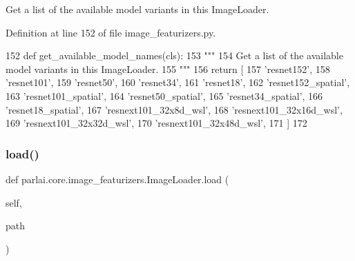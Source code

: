 \begin{DoxyVerb}Get a list of the available model variants in this ImageLoader.
\end{DoxyVerb}
 

Definition at line 152 of file image\+\_\+featurizers.\+py.


\begin{DoxyCode}
152     \textcolor{keyword}{def }get\_available\_model\_names(cls):
153         \textcolor{stringliteral}{"""}
154 \textcolor{stringliteral}{        Get a list of the available model variants in this ImageLoader.}
155 \textcolor{stringliteral}{        """}
156         \textcolor{keywordflow}{return} [
157             \textcolor{stringliteral}{'resnet152'},
158             \textcolor{stringliteral}{'resnet101'},
159             \textcolor{stringliteral}{'resnet50'},
160             \textcolor{stringliteral}{'resnet34'},
161             \textcolor{stringliteral}{'resnet18'},
162             \textcolor{stringliteral}{'resnet152\_spatial'},
163             \textcolor{stringliteral}{'resnet101\_spatial'},
164             \textcolor{stringliteral}{'resnet50\_spatial'},
165             \textcolor{stringliteral}{'resnet34\_spatial'},
166             \textcolor{stringliteral}{'resnet18\_spatial'},
167             \textcolor{stringliteral}{'resnext101\_32x8d\_wsl'},
168             \textcolor{stringliteral}{'resnext101\_32x16d\_wsl'},
169             \textcolor{stringliteral}{'resnext101\_32x32d\_wsl'},
170             \textcolor{stringliteral}{'resnext101\_32x48d\_wsl'},
171         ]
172 
\end{DoxyCode}
\mbox{\label{classparlai_1_1core_1_1image__featurizers_1_1ImageLoader_a40f68d29ad49a323cf50e08c6385e39e}} 
\subsubsection{\texorpdfstring{load()}{load()}}
{\footnotesize\ttfamily def parlai.\+core.\+image\+\_\+featurizers.\+Image\+Loader.\+load (\begin{DoxyParamCaption}\item[{}]{self,  }\item[{}]{path }\end{DoxyParamCaption})}

